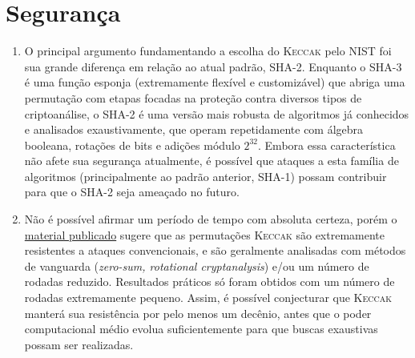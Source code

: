 \documentclass{article}
\begin{document}
\newpage

\section{Segurança}

\begin{enumerate}[label=(\alph*)]

\item O principal argumento fundamentando a escolha do \textsc{Keccak} pelo NIST
foi sua grande diferença em relação ao atual padrão, SHA-2. Enquanto o SHA-3 é
uma função esponja (extremamente flexível e customizável) que abriga uma
permutação com etapas focadas na proteção contra diversos tipos de
criptoanálise, o SHA-2 é uma versão mais robusta de algoritmos já conhecidos e
analisados exaustivamente, que operam repetidamente com álgebra booleana,
rotações de bits e adições módulo $2^{32}$. Embora essa característica não afete
sua segurança atualmente, é possível que ataques a esta família de algoritmos
(principalmente ao padrão anterior, SHA-1) possam contribuir para que o SHA-2
seja ameaçado no futuro.

\item Não é possível afirmar um período de tempo com absoluta certeza, porém o
\href{http://keccak.noekeon.org/third_party.html}{material publicado} sugere que
as permutações \textsc{Keccak} são extremamente resistentes a ataques
convencionais, e são geralmente analisadas com métodos de vanguarda
(\emph{zero-sum, rotational cryptanalysis}) e/ou um número de rodadas reduzido.
Resultados práticos só foram obtidos com um número de rodadas extremamente
pequeno. Assim, é possível conjecturar que \textsc{Keccak} manterá sua
resistência por pelo menos um decênio, antes que o poder computacional médio
evolua suficientemente para que buscas exaustivas possam ser realizadas.

\end{enumerate}



\end{document}
